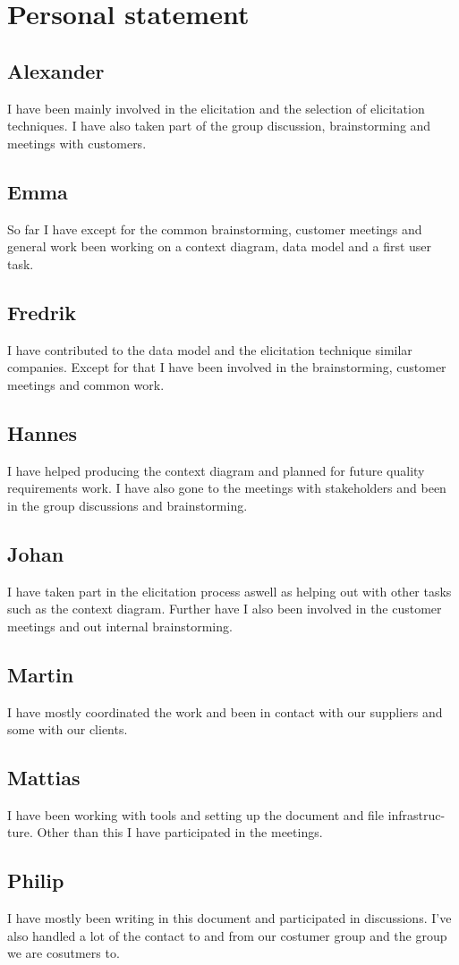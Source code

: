 \documentclass[a4paper]{article}
\begin{document}
  \section{Personal statement}
  
  \subsection{Alexander}
  I have been mainly involved in the elicitation and the selection of elicitation
techniques. I have also taken part of the group discussion, brainstorming and
meetings with customers.
  \subsection{Emma}
	So far I have except for the common brainstorming, customer meetings and general work been working on a context diagram, data model and a first user task.	
  \subsection{Fredrik}
  	I have contributed to the data model and the elicitation technique similar companies. Except for that I have been involved in the brainstorming, customer meetings and common work. 
  \subsection{Hannes}
  I have helped producing the context diagram and planned for future quality
requirements work. I have also gone to the meetings with stakeholders and
been in the group discussions and brainstorming.
  \subsection{Johan}
  I have taken part in the elicitation process aswell as helping out with other tasks
such as the context diagram. Further have I also been involved in the customer
meetings and out internal brainstorming.
  \subsection{Martin}
  I have mostly coordinated the work and been in contact with our suppliers and
some with our clients.
  \subsection{Mattias}
I have been working with tools and setting up the document and file infrastruc-
ture. Other than this I have participated in the meetings.
  \subsection{Philip}
  I have mostly been writing in this document and participated in discussions. 
  I've also handled a lot of the contact to and from our costumer group and the group we are cosutmers to.
\end{document}
